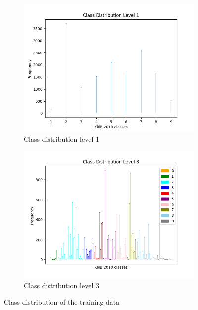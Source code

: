 \documentclass[12pt, a4paper, titlepage]{article}
\begin{document}
\begin{figure}
  \begin{subfigure}{.5\textwidth}
    \centering
    \includegraphics[width=.9\linewidth]{training_data_short_L1.png}
    \caption{\label{fig: F9} Class distribution level 1}
  \end{subfigure}%
  \begin{subfigure}{.5\textwidth}
    \centering
    \includegraphics[width=.9\linewidth]{training_data_short_L3.png}
    \caption{\label{fig: F10} Class distribution level 3}
  \end{subfigure}
  \caption{Class distribution of the training data}
  \end{figure}
\end{document}
